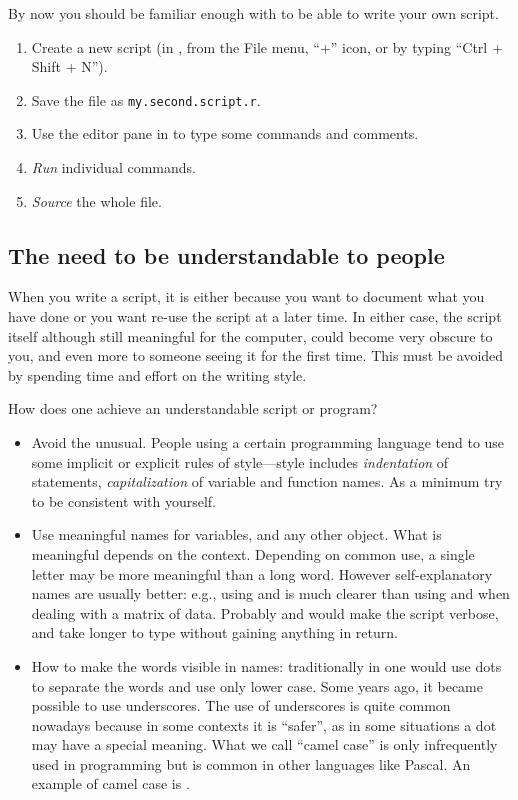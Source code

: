 \documentclass[krantz2]{krantz}\usepackage{knitr}
\begin{document}
\begin{playground}
By now you should be familiar enough with \Rlang to be able to write your own script.
\begin{enumerate}
  \item Create a new \Rpgrm script (in \RStudio, from the File menu, ``+'' icon, or by typing ``Ctrl + Shift + N'').
  \item Save the file as \texttt{my.second.script.r}.
  \item Use the editor pane in \RStudio to type some \Rpgrm commands and comments.
  \item \emph{Run} individual commands.
  \item \emph{Source} the whole file.
\end{enumerate}
\end{playground}

\subsection{The need to be understandable to people}\label{sec:script:readability}

When you write a script, it is either because you want to document what you have done or you want re-use the script at a later time. In either case, the script itself although still meaningful for the computer, could become very obscure to you, and even more to someone seeing it for the first time. This must be avoided by spending time and effort on the writing style.

How does one achieve an understandable script or program?
\begin{itemize}
  \item Avoid the unusual. People using a certain programming language tend to use some implicit or explicit rules of style---style includes \textit{indentation} of statements, \textit{capitalization} of variable and function names. As a minimum try to be consistent with yourself.
  \item Use meaningful names for variables, and any other object. What is meaningful depends on the context. Depending on common use, a single letter may be more meaningful than a long word. However self-explanatory names are usually better: e.g.,  using  and  is much clearer than using  and  when dealing with a matrix of data. Probably  and  would make the script verbose, and take longer to type without gaining anything in return.
  \item How to make the words visible in names: traditionally in \Rlang one would use dots to separate the words and use only lower case. Some years ago, it became possible to use underscores. The use of underscores is quite common nowadays because in some contexts it is ``safer'', as in some situations a dot may have a special meaning. What we call ``camel case'' is only infrequently used in \Rlang programming but is common in other languages like Pascal. An example of camel case is .
\end{itemize}
\end{document}

